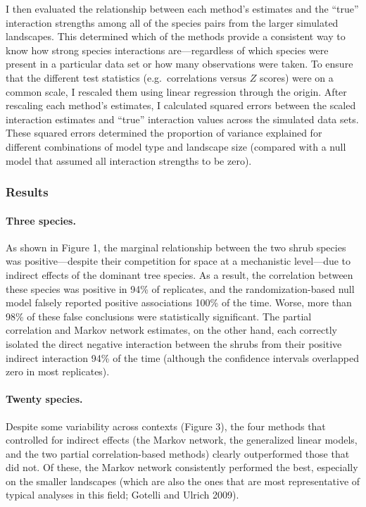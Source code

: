\documentclass[12pt,]{article}
\begin{document}
\begin{spacing}{1.9}
\begin{flushleft}
I then evaluated the relationship between each method's estimates and
the ``true'' interaction strengths among all of the species pairs from
the larger simulated landscapes. This determined which of the methods
provide a consistent way to know how strong species interactions
are---regardless of which species were present in a particular data set
or how many observations were taken. To ensure that the different test
statistics (e.g.~correlations versus \(Z\) scores) were on a common
scale, I rescaled them using linear regression through the origin. After
rescaling each method's estimates, I calculated squared errors between
the scaled interaction estimates and ``true'' interaction values across
the simulated data sets. These squared errors determined the proportion
of variance explained for different combinations of model type and
landscape size (compared with a null model that assumed all interaction
strengths to be zero).

\subsubsection{Results}\label{results}

\paragraph{Three species.}\label{three-species.}

As shown in Figure 1, the marginal relationship between the two shrub
species was positive---despite their competition for space at a
mechanistic level---due to indirect effects of the dominant tree
species. As a result, the correlation between these species was positive
in 94\% of replicates, and the randomization-based null model falsely
reported positive associations 100\% of the time. Worse, more than 98\%
of these false conclusions were statistically significant. The partial
correlation and Markov network estimates, on the other hand, each
correctly isolated the direct negative interaction between the shrubs
from their positive indirect interaction 94\% of the time (although the
confidence intervals overlapped zero in most replicates).

\paragraph{Twenty species.}\label{twenty-species.}

Despite some variability across contexts (Figure 3), the four methods
that controlled for indirect effects (the Markov network, the
generalized linear models, and the two partial correlation-based
methods) clearly outperformed those that did not. Of these, the Markov
network consistently performed the best, especially on the smaller
landscapes (which are also the ones that are most representative of
typical analyses in this field; Gotelli and Ulrich 2009).


\end{flushleft}
\end{spacing}
\end{document}

